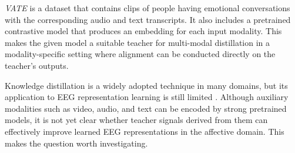 \textit{VATE} \cite{10.1007/978-3-031-91575-8_13} is a dataset that contains clips of people having emotional conversations with the corresponding audio and  text transcripts.
It also includes a pretrained contrastive model that produces an embedding for each input modality.
This makes the given model a suitable teacher for multi-modal distillation in a modality-specific setting where alignment can be conducted directly on the teacher's outputs.

Knowledge distillation is a widely adopted technique in many domains, but its application to EEG representation learning is still limited \cite{ZHANG202399, ZHANG2022108833}.
Although auxiliary modalities such as video, audio, and text can be encoded by strong pretrained models, it is not yet clear whether teacher signals derived from them can effectively improve learned EEG representations in the affective domain.
This makes the question worth investigating.